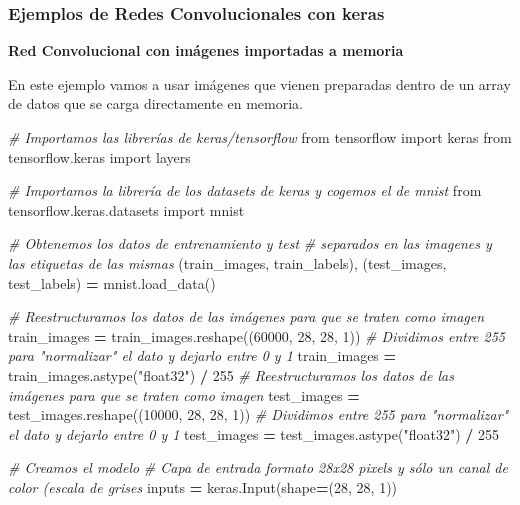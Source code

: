 \documentclass[
  a4paper,
  DIV=11,
  numbers=noendperiod]{scrreprt}
\newenvironment{Shaded}{\begin{snugshade}}{\end{snugshade}}
\newcommand{\CommentTok}[1]{\textcolor[rgb]{0.56,0.35,0.01}{\textit{#1}}}
\newcommand{\DecValTok}[1]{\textcolor[rgb]{0.00,0.00,0.81}{#1}}
\newcommand{\ImportTok}[1]{#1}
\newcommand{\NormalTok}[1]{#1}
\newcommand{\OperatorTok}[1]{\textcolor[rgb]{0.81,0.36,0.00}{\textbf{#1}}}
\newcommand{\StringTok}[1]{\textcolor[rgb]{0.31,0.60,0.02}{#1}}
\begin{document}
\subsubsection{Ejemplos de Redes Convolucionales con
keras}\label{ejemplos-de-redes-convolucionales-con-keras}

\textbf{Red Convolucional con imágenes importadas a memoria}

En este ejemplo vamos a usar imágenes que vienen preparadas dentro de un
array de datos que se carga directamente en memoria.

\begin{Shaded}
\begin{Highlighting}[numbers=left,,]

\CommentTok{\# Importamos las librerías de keras/tensorflow}
\ImportTok{from}\NormalTok{ tensorflow }\ImportTok{import}\NormalTok{ keras}
\ImportTok{from}\NormalTok{ tensorflow.keras }\ImportTok{import}\NormalTok{ layers}

\CommentTok{\# Importamos la librería de los datasets de keras y cogemos el de mnist}
\ImportTok{from}\NormalTok{ tensorflow.keras.datasets }\ImportTok{import}\NormalTok{ mnist}

\CommentTok{\# Obtenemos los datos de entrenamiento y test}
\CommentTok{\# separados en las imagenes y las etiquetas de las mismas}
\NormalTok{(train\_images, train\_labels), (test\_images, test\_labels) }\OperatorTok{=}\NormalTok{ mnist.load\_data()}

\CommentTok{\# Reestructuramos los datos de las imágenes para que se traten como imagen}
\NormalTok{train\_images }\OperatorTok{=}\NormalTok{ train\_images.reshape((}\DecValTok{60000}\NormalTok{, }\DecValTok{28}\NormalTok{, }\DecValTok{28}\NormalTok{, }\DecValTok{1}\NormalTok{))}
\CommentTok{\# Dividimos entre 255 para "normalizar" el dato y dejarlo entre 0 y 1}
\NormalTok{train\_images }\OperatorTok{=}\NormalTok{ train\_images.astype(}\StringTok{"float32"}\NormalTok{) }\OperatorTok{/} \DecValTok{255}
\CommentTok{\# Reestructuramos los datos de las imágenes para que se traten como imagen}
\NormalTok{test\_images }\OperatorTok{=}\NormalTok{ test\_images.reshape((}\DecValTok{10000}\NormalTok{, }\DecValTok{28}\NormalTok{, }\DecValTok{28}\NormalTok{, }\DecValTok{1}\NormalTok{))}
\CommentTok{\# Dividimos entre 255 para "normalizar" el dato y dejarlo entre 0 y 1}
\NormalTok{test\_images }\OperatorTok{=}\NormalTok{ test\_images.astype(}\StringTok{"float32"}\NormalTok{) }\OperatorTok{/} \DecValTok{255}


\CommentTok{\# Creamos el modelo}
\CommentTok{\# Capa de entrada formato 28x28 pixels y sólo un canal de color (escala de grises}
\NormalTok{inputs }\OperatorTok{=}\NormalTok{ keras.Input(shape}\OperatorTok{=}\NormalTok{(}\DecValTok{28}\NormalTok{, }\DecValTok{28}\NormalTok{, }\DecValTok{1}\NormalTok{))}


\end{Highlighting}
\end{Shaded}
\end{document}

